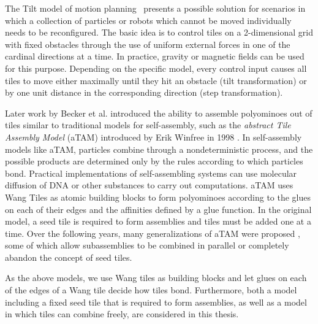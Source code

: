 The Tilt model of motion planning~\cite{Becker2013} presents a possible solution for scenarios in which a collection of particles or robots which cannot be moved individually needs to be reconfigured. The basic idea is to control tiles on a 2-dimensional grid with fixed obstacles through the use of uniform external forces in one of the cardinal directions at a time. In practice, gravity or magnetic fields can be used for this purpose. Depending on the specific model, every control input causes all tiles to move either maximally until they hit an obstacle (tilt transformation) or by one unit distance in the corresponding direction (step transformation). \par
Later work by Becker et al. \cite{Becker2017} introduced the ability to assemble polyominoes out of tiles similar to traditional models for self-assembly, such as the \emph{abstract Tile
Assembly Model} (aTAM) introduced by Erik Winfree in 1998 \cite{Winfree1998}.
In self-assembly models like aTAM, particles combine through a nondeterministic process, and the possible products are determined only by the rules according to which particles bond. Practical implementations of self-assembling systems can use molecular diffusion of DNA or other substances to carry out computations.
aTAM uses Wang Tiles \cite{Wang1961} as atomic building blocks to form polyominoes according to the glues on each of their edges and the affinities defined by a glue function. In the original model, a seed tile is required to form assemblies and tiles must be added one at a time. Over the following years, many generalizations of aTAM were proposed \cite{Chen2011a, Cannon2012, Demaine2008}, some of which allow subassemblies to be combined in parallel or completely abandon the concept of seed tiles. \par As the above models, we use Wang tiles as building blocks and let glues on each of the edges of a Wang tile decide how tiles bond. Furthermore, both a model including a fixed seed tile that is required to form assemblies, as well as a model in which tiles can combine freely, are considered in this thesis. \par

